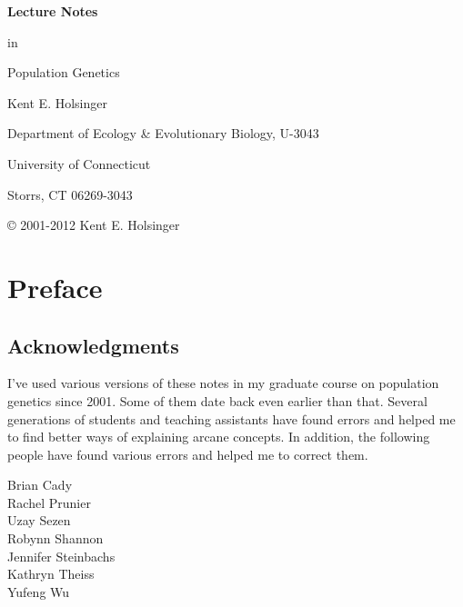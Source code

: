 \documentclass[12pt,titlepage,openright]{book}
\begin{document}
\begin{titlepage}

{\Large\bf \noindent Lecture Notes

\noindent in

\noindent Population Genetics

}

\vfill

{\noindent Kent E. Holsinger

\noindent Department of Ecology \& Evolutionary Biology, U-3043

\noindent University of Connecticut

\noindent Storrs, CT  06269-3043}

\vfill

\end{titlepage}


{\small\noindent \copyright{} 2001-2012 Kent E. Holsinger

\ccLicense}

\tableofcontents

\chapter*{Preface}

\section*{Acknowledgments}

I've used various versions of these notes in my graduate course on
population genetics
since 2001. Some of them date back even earlier than that. Several
generations of students and teaching assistants have found errors and
helped me to find better ways of explaining arcane concepts. In
addition, the following people have found various errors and helped me
to correct them.

\begin{multicols}{2}
\noindent Brian Cady \\
Rachel Prunier \\
Uzay Sezen \\
Robynn Shannon \\
Jennifer Steinbachs \\
Kathryn Theiss \\
Yufeng Wu \\
\end{multicols}
\end{document}
